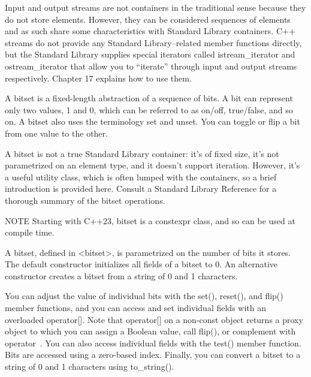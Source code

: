 
Input and output streams are not containers in the traditional sense because they do not store elements. However, they can be considered sequences of elements and as such share some characteristics with Standard Library containers. C++ streams do not provide any Standard Library–related member functions directly, but the Standard Library supplies special iterators called istream\_iterator and ostream\_iterator that allow you to “iterate” through input and output streams respectively. Chapter 17 explains how to use them.


A bitset is a fixed-length abstraction of a sequence of bits. A bit can represent only two values, 1 and 0, which can be referred to as on/off, true/false, and so on. A bitset also uses the terminology set and unset. You can toggle or flip a bit from one value to the other.

A bitset is not a true Standard Library container: it’s of fixed size, it’s not parametrized on an element type, and it doesn’t support iteration. However, it’s a useful utility class, which is often lumped with the containers, so a brief introduction is provided here. Consult a Standard Library Reference for a thorough summary of the bitset operations.


\begin{myNotic}{NOTE}
Starting with C++23, bitset is a constexpr class, and so can be used at compile time.
\end{myNotic}


A bitset, defined in <bitset>, is parametrized on the number of bits it stores. The default constructor initializes all fields of a bitset to 0. An alternative constructor creates a bitset from a string of 0 and 1 characters.

You can adjust the value of individual bits with the set(), reset(), and flip() member functions, and you can access and set individual fields with an overloaded operator[]. Note that operator[] on a non-const object returns a proxy object to which you can assign a Boolean value, call flip(), or complement with operator~. You can also access individual fields with the test() member function. Bits are accessed using a zero-based index. Finally, you can convert a bitset to a string of 0 and 1 characters using to\_string().

